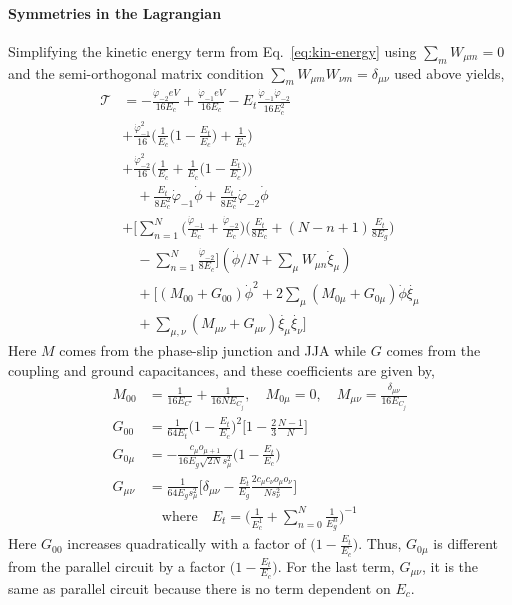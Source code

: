 \documentclass[%
reprint,
superscriptaddress,
 amsmath,amssymb,
 aps,
 prx,
longbibliography,
floatfix,
]{revtex4-2}
\begin{document}
\paragraph{Symmetries in the Lagrangian}
Simplifying the kinetic energy term from Eq.~\ref{eq:kin-energy} using $\sum_m W_{\mu m}=0$ and the semi-orthogonal matrix condition $\sum_m W_{\mu m}W_{\nu m}=\delta_{\mu\nu}$ used above yields,
\begin{align}
\mathcal{T}&=-\frac{\dot{\varphi}_{-2}eV}{16E_c}+\frac{\dot{\varphi}_{-1}eV}{16E_c}-E_t\frac{\dot{\varphi}_{-1}\dot{\varphi}_{-2}}{16E_c^2}\nonumber\\
    &+\frac{\dot{\varphi}^2_{-1}}{16}\Big(\frac{1}{E_c}\Big(1-\frac{E_t}{E_c}\Big)+\frac{1}{E_c}\Big)\\&+\frac{\dot{\varphi}^2_{-2}}{16}\Big(\frac{1}{E_c}+\frac{1}{E_c}\Big(1-\frac{E_t}{E_c}\Big)\Big)\nonumber\\&\quad+\frac{E_t}{8E_c^2}\dot{\varphi}_{-1}\dot{\phi}+\frac{E_t}{8E_c^2}\dot{\varphi}_{-2}\dot{\phi}\nonumber\\
      &+\Big[\sum_{n=1}^N\Big(\frac{\dot{\varphi}_{-1}}{E_c}+\frac{\dot{\varphi}_{-2}}{E_c}\Big)\Big(\frac{E_t}{8E_c}+(N-n+1)\frac{E_t}{8E_g}\Big)\nonumber\\&\quad-\sum_{n=1}^N\frac{\dot{\varphi}_{-2}}{8E_c}\Big](\dot{\phi}/N+\sum_\mu W_{\mu n}\dot{\xi}_\mu)\nonumber\\
    &\quad+\Big[(M_{00}+G_{00})\dot{\phi}^2+2\sum_{\mu}(M_{0\mu}+G_{0\mu})\dot{\phi}\dot{\xi_\mu}\nonumber\\&\quad+\sum_{\mu,\nu}(M_{\mu\nu}+G_{\mu\nu})\dot{\xi_\mu}\dot{\xi_\nu}\Big]    
    \end{align}
    Here $M$ comes from the phase-slip junction and JJA while $G$ comes from the coupling and ground capacitances, and these coefficients are given by,
    \begin{align}
    M_{00}&=\frac{1}{16E_{C'}}+\frac{1}{16NE_{C_j}},\quad M_{0\mu}=0,\quad    M_{\mu\nu}=\frac{\delta_{\mu\nu}}{16E_{C_j}}\\
    G_{00}&=\frac{1}{64E_t}\Big(1-\frac{E_t}{E_c}\Big)^2\Big[1-\frac{2}{3}\frac{N-1}{N}\Big]\\
    G_{0\mu}&=-\frac{c_\mu o_{\mu+1}}{16E_g\sqrt{2N}s_\mu^2}\Big(1-\frac{E_t}{E_c}\Big)\\
    G_{\mu\nu}&=\frac{1}{64E_gs_\mu^2}\Big[\delta_{\mu\nu}-\frac{E_t}{E_g}\frac{2c_\mu c_\nu o_\mu o_\nu}{N s_\nu^2}\Big]\\&\quad\text{where}\quad E_t=\Big(\frac{1}{E_c^1}+\sum_{n=0}^N\frac{1}{E^n_g}\Big)^{-1}\nonumber
\end{align}
Here $G_{00}$ increases quadratically with a factor of $\Big(1-\frac{E_t}{E_c}\Big)$. Thus, $G_{0\mu}$ is different from the parallel circuit by a factor $\Big(1-\frac{E_t}{E_c}\Big)$. 
For the last term, $G_{\mu\nu}$, it is the same as parallel circuit because there is no term dependent on $E_c$. 
\end{document}
